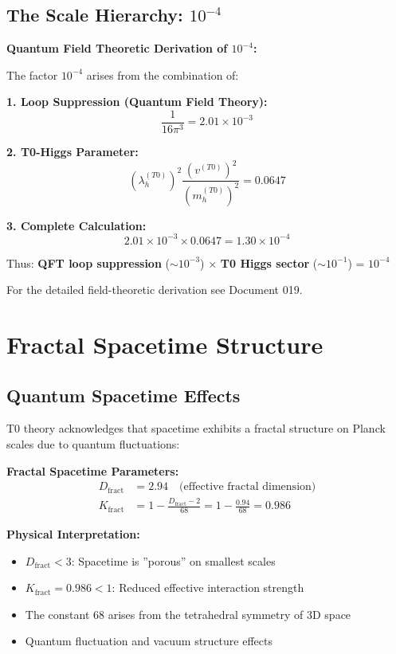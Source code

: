 	\subsection{The Scale Hierarchy: $10^{-4}$}
	
	\begin{foundation}
		\textbf{Quantum Field Theoretic Derivation of $10^{-4}$:}
		
		The factor $10^{-4}$ arises from the combination of:
		
		\textbf{1. Loop Suppression (Quantum Field Theory):}
		\begin{equation}
			\frac{1}{16\pi^3} = 2.01 \times 10^{-3}
		\end{equation}
		
		\textbf{2. T0-Higgs Parameter:}
		\begin{equation}
			(\lambda_h^{(T0)})^2 \frac{(v^{(T0)})^2}{(m_h^{(T0)})^2} = 0.0647
		\end{equation}
		
		\textbf{3. Complete Calculation:}
		\begin{equation}
			2.01 \times 10^{-3} \times 0.0647 = 1.30 \times 10^{-4}
		\end{equation}
		
		Thus: \textbf{QFT loop suppression} ($\sim 10^{-3}$) $\times$ \textbf{T0 Higgs sector} ($\sim 10^{-1}$) = $10^{-4}$
		
		For the detailed field-theoretic derivation see Document 019.
	\end{foundation}
	
	\section{Fractal Spacetime Structure}
	
	\subsection{Quantum Spacetime Effects}
	
	T0 theory acknowledges that spacetime exhibits a fractal structure on Planck scales due to quantum fluctuations:
	
	\begin{keyresult}
		\textbf{Fractal Spacetime Parameters:}
		\begin{align}
			D_{\text{fract}} &= 2.94 \quad \text{(effective fractal dimension)} \\
			K_{\text{fract}} &= 1 - \frac{D_{\text{fract}} - 2}{68} = 1 - \frac{0.94}{68} = 0.986
		\end{align}
		
		\textbf{Physical Interpretation:}
		\begin{itemize}
			\item $D_{\text{fract}} < 3$: Spacetime is ''porous'' on smallest scales
			\item $K_{\text{fract}} = 0.986 < 1$: Reduced effective interaction strength
			\item The constant 68 arises from the tetrahedral symmetry of 3D space
			\item Quantum fluctuation and vacuum structure effects
		\end{itemize}
	\end{keyresult}
	
